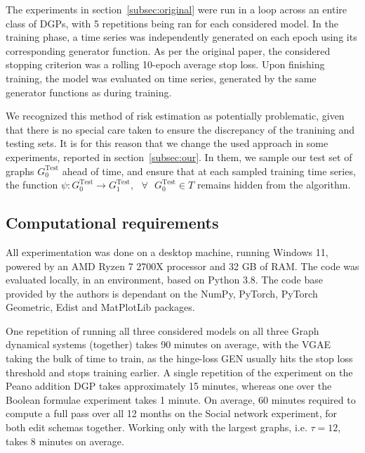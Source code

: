 The experiments in section~\ref{subsec:original} were run in a loop across an entire class of DGPs, with 5 repetitions being ran for each considered model. In the training phase, a time series was independently generated on each epoch using its corresponding generator function. As per the original paper, the considered stopping criterion was a rolling 10-epoch average stop loss. Upon finishing training, the model was evaluated on time series, generated by the same generator functions as during training.

We recognized this method of risk estimation as potentially problematic, given that there is no special care taken to ensure the discrepancy of the tranining and testing sets. It is for this reason that we change the used approach in some experiments, reported in section~\ref{subsec:our}. In them, we sample our test set of graphs $G_{0}^{\text{Test}}$ ahead of time, and ensure that at each sampled training time series, the function $\psi: G_{0}^{\text{Test}} \to G_{1}^{\text{Test}},\text{  } \forall \text{  } G_{0}^{\text{Test}} \in T$ remains hidden from the algorithm.



\subsection{Computational requirements}
All experimentation was done on a desktop machine, running Windows 11, powered by an AMD Ryzen 7 2700X processor and 32 GB of RAM. The code was evaluated locally, in an environment, based on Python 3.8. The code base provided by the authors is dependant on the NumPy, PyTorch, PyTorch Geometric, Edist \cite{Edist} and MatPlotLib packages.

One repetition of running all three considered models on all three Graph dynamical systems (together) takes 90 minutes on average, with the VGAE taking the bulk of time to train, as the hinge-loss GEN usually hits the stop loss threshold and stops training earlier. A single repetition of the experiment on the Peano addition DGP takes approximately 15 minutes, whereas one over the Boolean formulae experiment takes 1 minute. On average, 60 minutes required to compute a full pass over all 12 months on the Social network experiment, for both edit schemas together. Working only with the largest graphs, i.e. $\tau=12$, takes 8 minutes on average.

